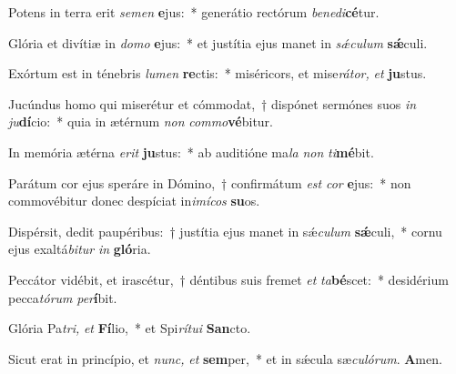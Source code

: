 \item Potens in terra erit \textit{semen} \textbf{e}jus:~* generátio rectórum \textit{benedi}\textbf{cé}tur.
\item Glória et divítiæ in \textit{domo} \textbf{e}jus:~* et justítia ejus manet in \textit{sǽculum} \textbf{sǽ}culi.
\item Exórtum est in ténebris \textit{lumen} \textbf{re}ctis:~* miséricors, et mise\textit{rátor,} \textit{et} \textbf{ju}stus.
\item Jucúndus homo qui miserétur et cómmodat,~† dispónet sermónes suos \textit{in} \textit{ju}\textbf{dí}cio:~* quia in ætérnum \textit{non} \textit{commo}\textbf{vé}bitur.
\item In memória ætérna \textit{erit} \textbf{ju}stus:~* ab auditióne ma\textit{la} \textit{non} \textit{ti}\textbf{mé}bit.
\item Parátum cor ejus speráre in Dómino,~† confirmátum \textit{est} \textit{cor} \textbf{e}jus:~* non commovébitur donec despíciat in\textit{imícos} \textbf{su}os.
\item Dispérsit, dedit paupéribus:~† justítia ejus manet in sǽ\textit{culum} \textbf{sǽ}culi,~* cornu ejus exaltá\textit{bitur} \textit{in} \textbf{gló}ria.
\item Peccátor vidébit, et irascétur,~† déntibus suis fremet \textit{et} \textit{ta}\textbf{bé}scet:~* desidérium pecca\textit{tórum} \textit{per}\textbf{í}bit.
\item Glória Pa\hspace{0.04em}\textit{tri,} \textit{et} \textbf{Fí}lio,~* et Spi\textit{rítui} \textbf{San}cto.
\item Sicut erat in princípio, et \textit{nunc,} \textit{et} \textbf{sem}per,~* et in sǽcula sæ\textit{culórum}. \textbf{A}men.
